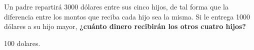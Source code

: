 \question[10] Un padre repartirá 3000 dólares entre sus cinco hijos, de tal forma que la diferencia entre los montos que reciba cada hijo sea la misma.
Si le entrega 1000 dólares a su hijo mayor,
\textbf{¿cuánto dinero recibirán los otros cuatro hijos?}

\begin{solutionbox}{2cm}
    100 dolares.
\end{solutionbox}